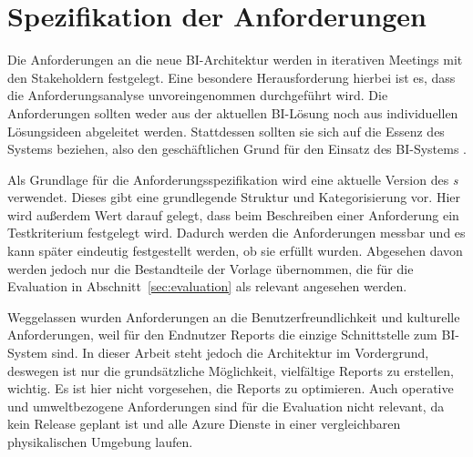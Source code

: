 \section{Spezifikation der Anforderungen}
Die Anforderungen an die neue BI-Architektur werden in iterativen Meetings mit den Stakeholdern festgelegt. Eine besondere Herausforderung hierbei ist es, dass die Anforderungsanalyse unvoreingenommen durchgeführt wird. Die Anforderungen sollten weder aus der aktuellen BI-Lösung noch aus individuellen Lösungsideen abgeleitet werden. Stattdessen sollten sie sich auf die Essenz des Systems beziehen, also den geschäftlichen Grund für den Einsatz des BI-Systems \cite[vgl.][]{robertson_mastering_2013}.

Als Grundlage für die Anforderungsspezifikation wird eine aktuelle Version des \textit{s} \cite{robertson_volere_2020} verwendet. Dieses gibt eine grundlegende Struktur und Kategorisierung vor. Hier wird außerdem Wert darauf gelegt, dass beim Beschreiben einer Anforderung ein Testkriterium festgelegt wird. Dadurch werden die Anforderungen messbar und es kann später eindeutig festgestellt werden, ob sie erfüllt wurden. Abgesehen davon werden jedoch nur die Bestandteile der Vorlage übernommen, die für die Evaluation in Abschnitt~\ref{sec:evaluation} als relevant angesehen werden.

Weggelassen wurden Anforderungen an die Benutzerfreundlichkeit und kulturelle Anforderungen, weil für den Endnutzer Reports die einzige Schnittstelle zum BI-System sind. In dieser Arbeit steht jedoch die Architektur im Vordergrund, deswegen ist nur die grundsätzliche Möglichkeit, vielfältige Reports zu erstellen, wichtig. Es ist hier nicht vorgesehen, die Reports zu optimieren. Auch operative und umweltbezogene Anforderungen sind für die Evaluation nicht relevant, da kein Release geplant ist und alle Azure Dienste in einer vergleichbaren physikalischen Umgebung laufen.
